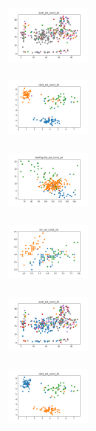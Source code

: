 \begin{figure}[H]
\begin{subfigure}
        \centering
        \includegraphics[width=0.234\textwidth]{img/bl/ecoli_set_const_20_589741062_clust.png}
    \end{subfigure}
    \hfill
    \begin{subfigure}
        \centering
        \includegraphics[width=0.234\textwidth]{img/bl/rand_set_const_20_589741062_clust.png}
    \end{subfigure}
    \hfill
    \begin{subfigure}
        \centering
        \includegraphics[width=0.234\textwidth]{img/bl/newthyroid_set_const_20_589741062_clust.png}
    \end{subfigure}
    \hfill
    \begin{subfigure}
        \centering
        \includegraphics[width=0.234\textwidth]{img/bl/iris_set_const_20_277451237_clust.png}
    \end{subfigure}
    \hfill
    \begin{subfigure}
        \centering
        \includegraphics[width=0.234\textwidth]{img/bl/ecoli_set_const_20_277451237_clust.png}
    \end{subfigure}
    \hfill
    \begin{subfigure}
        \centering
        \includegraphics[width=0.234\textwidth]{img/bl/rand_set_const_20_277451237_clust.png}

\end{subfigure}
\end{figure}
